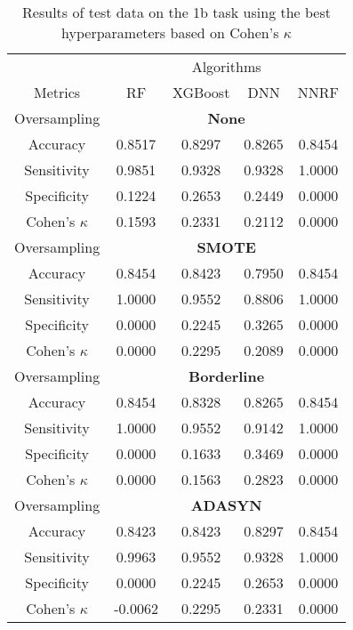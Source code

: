 \begin{table}[!htb]
\centering
\caption{Results of test data on the 1b task using the best hyperparameters based on Cohen's $\kappa$}
\label{tab:1b_test_results}
\begin{tabular}{c | c c c c}
\hline
 & \multicolumn{4}{c}{Algorithms}\\ 
Metrics &RF & XGBoost & DNN & NNRF\\ 
\hline
Oversampling &\multicolumn{4}{|c}{\textbf{None}}\\ 
\hline
Accuracy & 0.8517 & 0.8297 & 0.8265 & 0.8454\\ 
Sensitivity & 0.9851 & 0.9328 & 0.9328 & 1.0000\\ 
Specificity & 0.1224 & 0.2653 & 0.2449 & 0.0000\\ 
Cohen's $\kappa$ & 0.1593 & 0.2331 & 0.2112 & 0.0000\\ 
\hline
Oversampling &\multicolumn{4}{|c}{\textbf{SMOTE}}\\ 
\hline
Accuracy & 0.8454 & 0.8423 & 0.7950 & 0.8454\\ 
Sensitivity & 1.0000 & 0.9552 & 0.8806 & 1.0000\\ 
Specificity & 0.0000 & 0.2245 & 0.3265 & 0.0000\\ 
Cohen's $\kappa$ & 0.0000 & 0.2295 & 0.2089 & 0.0000\\ 
\hline
Oversampling &\multicolumn{4}{|c}{\textbf{Borderline}}\\ 
\hline
Accuracy & 0.8454 & 0.8328 & 0.8265 & 0.8454\\ 
Sensitivity & 1.0000 & 0.9552 & 0.9142 & 1.0000\\ 
Specificity & 0.0000 & 0.1633 & 0.3469 & 0.0000\\ 
Cohen's $\kappa$ & 0.0000 & 0.1563 & 0.2823 & 0.0000\\ 
\hline
Oversampling &\multicolumn{4}{|c}{\textbf{ADASYN}}\\ 
\hline
Accuracy & 0.8423 & 0.8423 & 0.8297 & 0.8454\\ 
Sensitivity & 0.9963 & 0.9552 & 0.9328 & 1.0000\\ 
Specificity & 0.0000 & 0.2245 & 0.2653 & 0.0000\\ 
Cohen's $\kappa$ & -0.0062 & 0.2295 & 0.2331 & 0.0000\\ 
\hline
\end{tabular}
\end{table}

